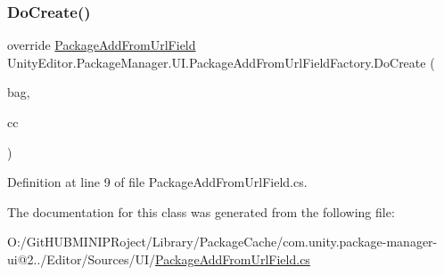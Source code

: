 \subsubsection{\texorpdfstring{DoCreate()}{DoCreate()}}
{\footnotesize\ttfamily override \mbox{\hyperlink{class_unity_editor_1_1_package_manager_1_1_u_i_1_1_package_add_from_url_field}{Package\+Add\+From\+Url\+Field}} Unity\+Editor.\+Package\+Manager.\+U\+I.\+Package\+Add\+From\+Url\+Field\+Factory.\+Do\+Create (\begin{DoxyParamCaption}\item[{I\+Uxml\+Attributes}]{bag,  }\item[{Creation\+Context}]{cc }\end{DoxyParamCaption})\hspace{0.3cm}{\ttfamily [protected]}}



Definition at line 9 of file Package\+Add\+From\+Url\+Field.\+cs.



The documentation for this class was generated from the following file\+:\begin{DoxyCompactItemize}
\item 
O\+:/\+Git\+H\+U\+B\+M\+I\+N\+I\+P\+Roject/\+Library/\+Package\+Cache/com.\+unity.\+package-\/manager-\/ui@2../\+Editor/\+Sources/\+U\+I/\mbox{\hyperlink{_package_add_from_url_field_8cs}{Package\+Add\+From\+Url\+Field.\+cs}}\end{DoxyCompactItemize}
